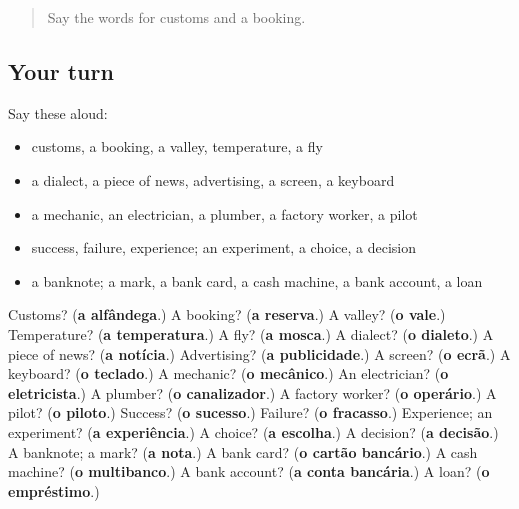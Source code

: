 \label{lesson:PT-R248-second-pass-words-from-chapters-244-248}



\begin{quote}
Say the words for customs and a booking.
\end{quote}

\subsection*{Your turn}
Say these aloud:

\begin{itemize}
\raggedright
  \item customs, a booking, a valley, temperature, a fly
  \item a dialect, a piece of news, advertising, a screen, a keyboard
  \item a mechanic, an electrician, a plumber, a factory worker, a pilot
  \item success, failure, experience; an experiment, a choice, a decision
  \item a banknote; a mark, a bank card, a cash machine, a bank account, a loan
\end{itemize}

\begin{tcolorbox}[breakable,colback=teal!4,colframe=teal!35!black,title={Before you move on}]
Customs? (\textbf{a alfândega}.) A booking? (\textbf{a reserva}.) A valley? (\textbf{o vale}.) Temperature? (\textbf{a temperatura}.) A fly? (\textbf{a mosca}.) A dialect? (\textbf{o dialeto}.) A piece of news? (\textbf{a notícia}.) Advertising? (\textbf{a publicidade}.) A screen? (\textbf{o ecrã}.) A keyboard? (\textbf{o teclado}.) A mechanic? (\textbf{o mecânico}.) An electrician? (\textbf{o eletricista}.) A plumber? (\textbf{o canalizador}.) A factory worker? (\textbf{o operário}.) A pilot? (\textbf{o piloto}.) Success? (\textbf{o sucesso}.) Failure? (\textbf{o fracasso}.) Experience; an experiment? (\textbf{a experiência}.) A choice? (\textbf{a escolha}.) A decision? (\textbf{a decisão}.) A banknote; a mark? (\textbf{a nota}.) A bank card? (\textbf{o cartão bancário}.) A cash machine? (\textbf{o multibanco}.) A bank account? (\textbf{a conta bancária}.) A loan? (\textbf{o empréstimo}.)
\end{tcolorbox}

